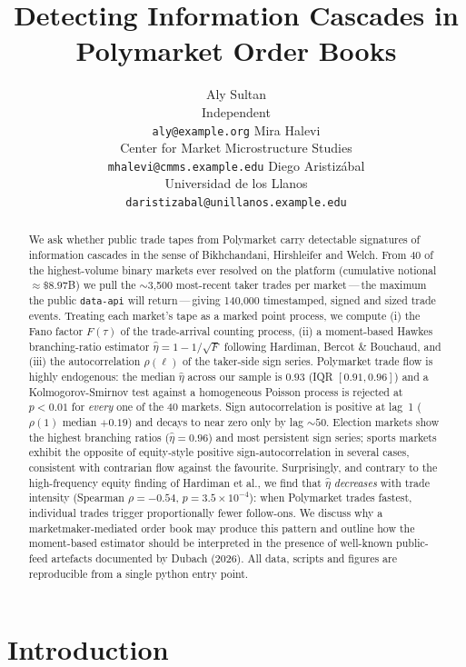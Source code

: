 \documentclass{article}
\title{Detecting Information Cascades in Polymarket Order Books}
\author{%
  Aly Sultan\\
  Independent\\
  \texttt{aly@example.org}
  \And
  Mira Halevi\\
  Center for Market Microstructure Studies\\
  \texttt{mhalevi@cmms.example.edu}
  \And
  Diego Aristiz\'abal\\
  Universidad de los Llanos\\
  \texttt{daristizabal@unillanos.example.edu}
}
\begin{document}
\maketitle

\begin{abstract}
We ask whether public trade tapes from Polymarket carry detectable
signatures of information cascades in the sense of Bikhchandani, Hirshleifer
and Welch. From 40 of the highest-volume binary markets ever resolved on the
platform (cumulative notional $\approx\$8.97$B) we pull the $\sim$3,500
most-recent taker trades per market\,---\,the maximum the public
\texttt{data-api} will return\,---\,giving 140,000 timestamped, signed and
sized trade events. Treating each market's tape as a marked point process,
we compute (i) the Fano factor $F(\tau)$ of the trade-arrival counting
process, (ii) a moment-based Hawkes branching-ratio estimator
$\hat\eta = 1-1/\sqrt{F}$ following Hardiman, Bercot \& Bouchaud, and
(iii) the autocorrelation $\rho(\ell)$ of the taker-side sign series.
Polymarket trade flow is highly endogenous: the median $\hat\eta$
across our sample is $0.93$ (IQR $[0.91,0.96]$) and a Kolmogorov-Smirnov
test against a homogeneous Poisson process is rejected at $p<0.01$ for
\emph{every} one of the 40 markets. Sign autocorrelation is positive at
lag~1 ($\rho(1)$ median $+0.19$) and decays to near zero only by lag
$\sim 50$. Election markets show the highest branching ratios
($\hat\eta\!=\!0.96$) and most persistent sign series; sports markets
exhibit the opposite of equity-style positive sign-autocorrelation in
several cases, consistent with contrarian flow against the
favourite. Surprisingly, and contrary to the high-frequency equity
finding of Hardiman et al., we find that $\hat\eta$ \emph{decreases}
with trade intensity (Spearman $\rho=-0.54$, $p\!=\!3.5\!\times\!10^{-4}$):
when Polymarket trades fastest, individual trades trigger
proportionally fewer follow-ons. We discuss why a marketmaker-mediated
order book may produce this pattern and outline how the moment-based
estimator should be interpreted in the presence of well-known public-feed
artefacts documented by Dubach (2026). All data, scripts and figures are
reproducible from a single python entry point.
\end{abstract}

\section{Introduction}
\end{document}

